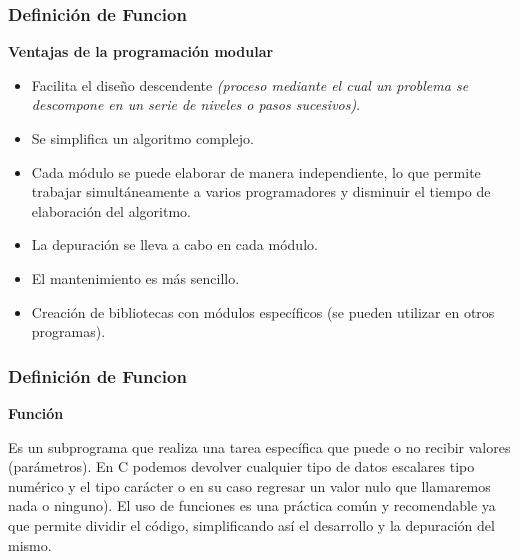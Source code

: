 \begin{frame}
    \frametitle{Definición de Funcion}
    \begin{center}
        \textbf{Ventajas de la programación modular}
    \end{center}
    \vspace{-8mm}
    \begin{itemize}
        \item Facilita el diseño descendente \textit{(proceso mediante el cual un problema se descompone en un serie de niveles o pasos sucesivos)}.\pause
        \item Se simplifica un algoritmo complejo.\pause
        \item Cada módulo se puede elaborar de manera independiente, lo que permite trabajar simultáneamente a varios programadores y disminuir el tiempo de elaboración del algoritmo.\pause
        \item La depuración se lleva a cabo en cada módulo.\pause
        \item El mantenimiento es más sencillo.\pause
        \item Creación de bibliotecas con módulos específicos (se pueden utilizar en otros programas).
    \end{itemize}
\end{frame}



\begin{frame}
\frametitle{Definición de Funcion}
\begin{center}
    \textbf{Función}
\end{center}
\hspace{5mm}Es un subprograma que realiza una tarea específica que puede o no recibir valores (parámetros). En C podemos devolver cualquier tipo de datos escalares tipo numérico y el tipo carácter o en su caso regresar un valor nulo que llamaremos nada o ninguno). El uso de funciones es una práctica común y recomendable ya que permite dividir el código, simplificando así el desarrollo y la depuración del mismo.
\end{frame}